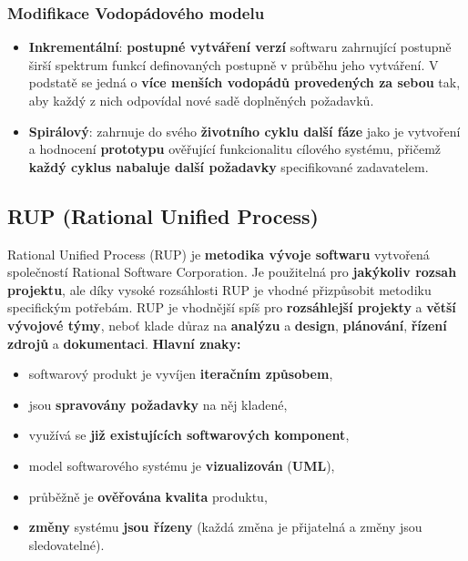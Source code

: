 \subsubsection{Modifikace Vodopádového modelu}
\begin{itemize}
\item \textbf{Inkrementální}: \textbf{postupné vytváření verzí} softwaru zahrnující postupně širší spektrum funkcí definovaných postupně v průběhu jeho vytváření. V podstatě se jedná o \textbf{více menších vodopádů provedených za sebou} tak, aby každý z nich odpovídal nové sadě doplněných požadavků.
\item \textbf{Spirálový}: zahrnuje do svého \textbf{životního cyklu další fáze} jako je vytvoření a hodnocení \textbf{prototypu} ověřující funkcionalitu cílového systému, přičemž \textbf{každý cyklus nabaluje další požadavky} specifikované zadavatelem.
\end{itemize}


\subsection{RUP (Rational Unified Process)}
Rational Unified Process (RUP) je \textbf{metodika vývoje softwaru} vytvořená společností Rational Software Corporation. Je použitelná pro \textbf{jakýkoliv rozsah projektu}, ale díky vysoké rozsáhlosti RUP je vhodné přizpůsobit metodiku specifickým potřebám. RUP je vhodnější spíš pro \textbf{rozsáhlejší projekty} a \textbf{větší vývojové týmy}, neboť klade důraz na \textbf{analýzu} a \textbf{design}, \textbf{plánování}, \textbf{řízení zdrojů} a \textbf{dokumentaci}. \textbf{Hlavní znaky:}

\begin{itemize}
\item softwarový produkt je vyvíjen \textbf{iteračním způsobem},
\item jsou \textbf{spravovány požadavky} na něj kladené,
\item využívá se \textbf{již existujících softwarových komponent},
\item model softwarového systému je \textbf{vizualizován} (\textbf{UML}),
\item průběžně je \textbf{ověřována} \textbf{kvalita} produktu,
\item \textbf{změny} systému\textbf{ jsou řízeny} (každá změna je přijatelná a změny jsou sledovatelné).
\end{itemize}

